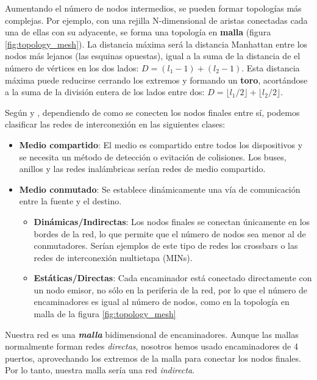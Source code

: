 Aumentando el número de nodos intermedios, se pueden formar topologías más complejas. Por ejemplo, con una rejilla N-dimensional de aristas conectadas cada una de ellas con su adyacente, se forma una topología en \textbf{malla} (figura \ref{fig:topology_mesh}). La distancia máxima será la distancia Manhattan entre los nodos más lejanos (las esquinas opuestas), igual a la suma de la distancia de el número de vértices en los dos lados: $D = (l_1-1)+(l_2-1)$. Esta distancia máxima puede reducirse cerrando los extremos y formando un \textbf{toro}, acortándose a la suma de la división entera de los lados entre dos: $D = \lfloor l_1/2\rfloor + \lfloor l_2/2\rfloor$.

Según \cite{Duato03} y \cite{HenessyPattersonF}, dependiendo de como se conecten los nodos finales entre sí, podemos clasificar las redes de interconexión en las siguientes clases:
\begin{itemize}
    \item \textbf{Medio compartido}: El medio es compartido entre todos los dispositivos y se necesita un método de detección o evitación de colisiones. Los buses, anillos y las redes inalámbricas serían redes de medio compartido.
    \item \textbf{Medio conmutado}: Se establece dinámicamente una vía de comunicación entre la fuente y el destino.
    \begin{itemize}
        \item \textbf{Dinámicas/Indirectas}: Los nodos finales se conectan únicamente en los bordes de la red, lo que permite que el número de nodos sea menor al de conmutadores. Serían ejemplos de este tipo de redes los crossbars o las redes de interconexión multietapa (MINs).
        \item \textbf{Estáticas/Directas}: Cada encaminador está conectado directamente con un nodo emisor, no sólo en la periferia de la red, por lo que el número de encaminadores es igual al número de nodos, como en la topología en malla de la figura \ref{fig:topology_mesh}
    \end{itemize}
\end{itemize}

\begin{recuadronoc}
    Nuestra red es una \textbf{\textit{malla}} bidimensional de encaminadores. Aunque las mallas normalmente forman redes \textit{directas}, nosotros hemos usado encaminadores de 4 puertos, aprovechando los extremos de la malla para conectar los nodos finales. Por lo tanto, nuestra malla sería una red \textit{indirecta}.
\end{recuadronoc}


